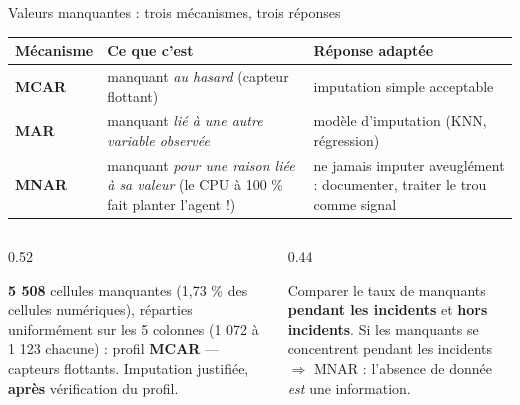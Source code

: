 \begin{frame}{Valeurs manquantes : trois mécanismes, trois réponses}
\begin{center}
\footnotesize
\begin{tabular}{@{}p{2.4cm}p{4.8cm}p{5.0cm}@{}}
\toprule
\textbf{Mécanisme} & \textbf{Ce que c'est} & \textbf{Réponse adaptée}\\
\midrule
\textbf{MCAR} & manquant \emph{au hasard} (capteur flottant) &
imputation simple acceptable\\
\addlinespace[1pt]
\textbf{MAR} & manquant \emph{lié à une autre variable observée} &
modèle d'imputation (KNN, régression)\\
\addlinespace[1pt]
\textbf{MNAR} & manquant \emph{pour une raison liée à sa valeur}
(le CPU à 100 \% fait planter l'agent !) &
ne jamais imputer aveuglément : documenter, traiter le trou comme signal\\
\bottomrule
\end{tabular}
\end{center}
\vspace{1mm}
\begin{columns}[t]
\begin{column}{0.52\textwidth}
\begin{ebox}
\textbf{5 508} cellules manquantes (1,73 \% des cellules numériques),
réparties uniformément sur les 5 colonnes (1 072 à 1 123 chacune) :
profil \textbf{MCAR} --- capteurs flottants. Imputation justifiée,
\textbf{après} vérification du profil.
\end{ebox}
\end{column}
\begin{column}{0.44\textwidth}
\begin{kbox}
Comparer le taux de manquants \textbf{pendant les incidents} et
\textbf{hors incidents}. Si les manquants se concentrent pendant les
incidents $\Rightarrow$ MNAR : l'absence de donnée \emph{est} une information.
\end{kbox}
\end{column}
\end{columns}
\end{frame}

